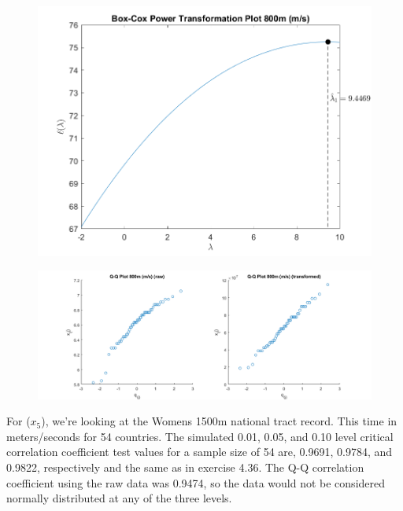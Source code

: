\begin{center}
    \begin{figure}[H]
        \centering
        \includegraphics[scale=0.6]{./matlab/chapter-4/sol4.37.power.4.png}
    \end{figure}
\end{center}

\begin{center}
    \begin{figure}[H]
        \centering
        \includegraphics[scale=0.4]{./matlab/chapter-4/sol4.37.qq.4.png}
    \end{figure}
\end{center}

For ($x_{5}$), we're looking at the Womens 1500m national tract record. This time in meters/seconds for 54 countries. The simulated 0.01, 0.05, and 0.10 level critical correlation coefficient test values for a sample size of 54 are, 0.9691, 0.9784, and 0.9822, respectively and the same as in exercise 4.36. The Q-Q correlation coefficient using the raw data was 0.9474, so the data would not be considered normally distributed at any of the three levels.

